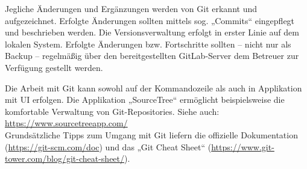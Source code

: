Jegliche Änderungen und Ergänzungen werden von Git erkannt und aufgezeichnet. Erfolgte Änderungen sollten mittels sog. „Commits“ eingepflegt und beschrieben werden. Die Versionsverwaltung erfolgt in erster Linie auf dem lokalen System. Erfolgte Änderungen bzw. Fortschritte sollten -- nicht nur als Backup -- regelmäßig über den bereitgestellten GitLab-Server dem Betreuer zur Verfügung gestellt werden.

Die Arbeit mit Git kann sowohl auf der Kommandozeile als auch in Applikation mit UI erfolgen. Die Applikation „SourceTree“ ermöglicht beispielsweise die komfortable Verwaltung von Git-Repositories. Siehe auch: \url{https://www.sourcetreeapp.com/}\\

Grundsätzliche Tipps zum Umgang mit Git liefern die offizielle Dokumentation (\url{https://git-scm.com/doc}) und das „Git Cheat Sheet“ (\url{https://www.git-tower.com/blog/git-cheat-sheet/}).